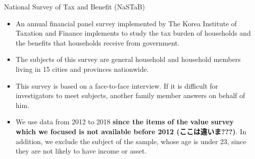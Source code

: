 \documentclass[
  ignorenonframetext,
  aspectratio=169,
]{beamer}
\providecommand{\tightlist}{%
  \setlength{\itemsep}{0pt}\setlength{\parskip}{0pt}}
\begin{document}
\begin{frame}{National Survey of Tax and Benefit (NaSTaB)}
\protect\hypertarget{national-survey-of-tax-and-benefit-nastab}{}
\begin{itemize}
\tightlist
\item
  An annual financial panel survey implemented by The Korea Institute of Taxation and Finance implements to study the tax burden of households and the benefits that households receive from government.
\item
  The subjects of this survey are general household and household members living in 15 cities and provinces nationwide.
\item
  This survey is based on a face-to-face interview. If it is difficult for investigators to meet subjects, another family member answers on behalf of him.
\item
  We use data from 2012 to 2018 \textbf{since the items of the value survey which we focused is not available before 2012 (ここは違いま???)}. In addition, we exclude the subject of the sample, whose age is under 23, since they are not likely to have income or asset.
\end{itemize}
\end{frame}
\end{document}
